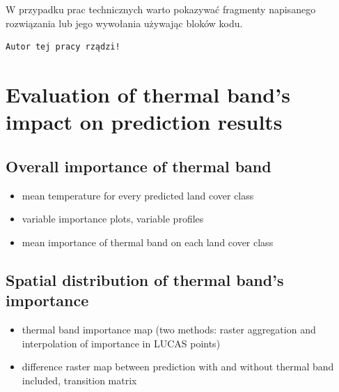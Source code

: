 \documentclass{amuthesis}
\begin{document}
W przypadku prac technicznych warto pokazywać fragmenty napisanego
rozwiązania lub jego wywołania używając bloków kodu.

\begin{Shaded}
\begin{Highlighting}[]
\OtherTok{=} 
  \NormalTok{)}
\NormalTok{\}}
\NormalTok{(}\NormalTok{)}
\end{Highlighting}
\end{Shaded}

\begin{verbatim}
Autor tej pracy rządzi!
\end{verbatim}


\hypertarget{sec-results-therm}{%
\chapter{Evaluation of thermal band's impact on prediction
results}\label{sec-results-therm}}

\hypertarget{sec-imp-overall}{%
\section{Overall importance of thermal band}\label{sec-imp-overall}}

\begin{itemize}
\item
  mean temperature for every predicted land cover class
\item
  variable importance plots, variable profiles
\item
  mean importance of thermal band on each land cover class
\end{itemize}

\hypertarget{sec-imp-spat}{%
\section{Spatial distribution of thermal band's
importance}\label{sec-imp-spat}}

\begin{itemize}
\item
  thermal band importance map (two methods: raster aggregation and
  interpolation of importance in LUCAS points)
\item
  difference raster map between prediction with and without thermal band
  included, transition matrix
\end{itemize}
\end{document}
